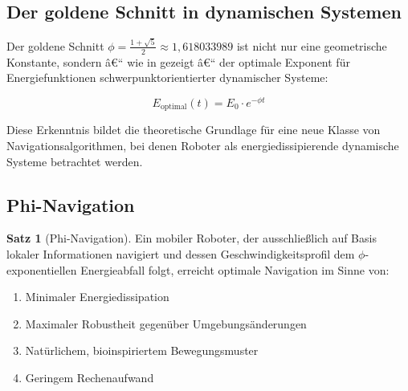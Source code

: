 ﻿\documentclass[a4paper,12pt]{article}
\theoremstyle{definition}
\newtheorem{satz}{Satz}
\begin{document}
\subsection{Der goldene Schnitt in dynamischen Systemen}

Der goldene Schnitt $\phi = \frac{1+\sqrt{5}}{2} \approx 1{,}618033989$ ist nicht nur eine geometrische Konstante, sondern â€“ wie in \cite{phi_energy} gezeigt â€“ der optimale Exponent für Energiefunktionen schwerpunktorientierter dynamischer Systeme:

\begin{equation}
E_{\text{optimal}}(t) = E_0 \cdot e^{-\phi t}
\end{equation}

Diese Erkenntnis bildet die theoretische Grundlage für eine neue Klasse von Navigationsalgorithmen, bei denen Roboter als energiedissipierende dynamische Systeme betrachtet werden.

\subsection{Phi-Navigation}

\begin{satz}[Phi-Navigation]
	Ein mobiler Roboter, der ausschließlich auf Basis lokaler Informationen navigiert und dessen Geschwindigkeitsprofil dem $\phi$-exponentiellen Energieabfall folgt, erreicht optimale Navigation im Sinne von:
	\begin{enumerate}
		\item[-] Minimaler Energiedissipation
		\item[-] Maximaler Robustheit gegenüber Umgebungsänderungen
		\item[-] Natürlichem, bioinspiriertem Bewegungsmuster
		\item[-] Geringem Rechenaufwand
	\end{enumerate}
\end{satz}
\end{document}

